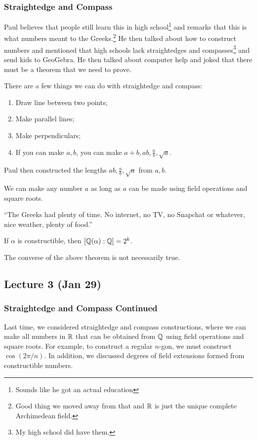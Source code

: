 \documentclass[10pt, twoside]{article}
\begin{document}
    \subsubsection{Straightedge and Compass}%
    Paul believes that people still learn this in high school\footnote{Sounds like he got an actual education} and remarks that this is what numbers meant to the Greeks.\footnote{Good thing we moved away from that and $\mathbb{R}$ is just the unique complete Archimedean field.} He then talked about how to construct numbers and mentioned that high schools lack straightedges and compasses\footnote{My high school did have them.} and send kids to GeoGebra. He then talked about computer help and joked that there must be a theorem that we need to prove.

    There are a few things we can do with straightedge and compass:
    \begin{enumerate}
        \item Draw line between two points;
        \item Make parallel lines;
        \item Make perpendiculars;
        \item If you can make $a,b$, you can make $a+b, ab, \frac{a}{b}, \sqrt{a}$.
    \end{enumerate}

    Paul then constructed the lengths $ab, \frac{a}{b}, \sqrt{a}$ from $a,b$.
    
    We can make any number $a$ as long as $a$ can be made using field operations and square roots.

    ``The Greeks had plenty of time. No internet, no TV, no Snapchat or whatever, nice weather, plenty of food.''

    \begin{thm}
        If $\alpha$ is constructible, then $[\mathbb{Q}(\alpha):\mathbb{Q}] = 2^k$.
    \end{thm}

    \begin{rmk}
        The converse of the above theorem is not necessarily true.
    \end{rmk}

    \subsection{Lecture 3 (Jan 29)}

    \subsubsection{Straightedge and Compass Continued}
    Last time, we considered straightedge and compass constructions, where we can make all numbers in $\mathbb{R}$ that can be obtained from $\mathbb{Q}$ using field operations and square roots. For example, to construct a regular $n$-gon, we must construct $\cos(2\pi/n)$. In addition, we discussed degrees of field extensions formed from constructible numbers.
\end{document}
